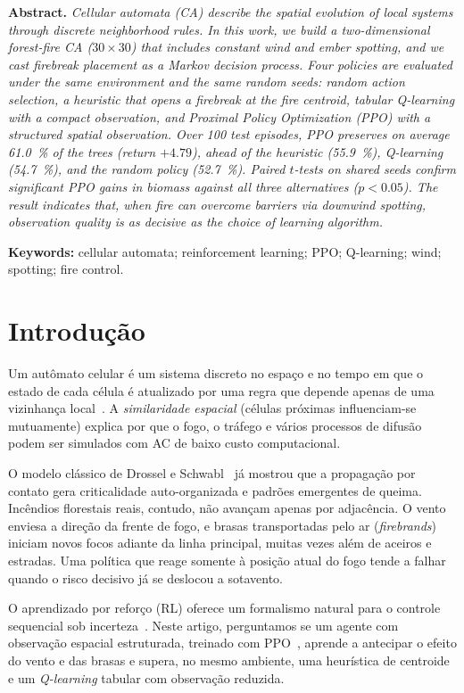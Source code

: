 \documentclass[11pt,a4paper]{article}
\begin{document}
\bigskip
\noindent\textbf{Abstract.}
\textit{Cellular automata (CA) describe the spatial evolution of local systems
through discrete neighborhood rules. In this work, we build a two-dimensional
forest-fire CA ($30\times 30$) that includes constant wind and ember spotting,
and we cast firebreak placement as a Markov decision process. Four policies
are evaluated under the same environment and the same random seeds: random
action selection, a heuristic that opens a firebreak at the fire centroid,
tabular \emph{Q-learning} with a compact observation, and Proximal Policy
Optimization (PPO) with a structured spatial observation. Over 100 test episodes, PPO
preserves on average \SI{61.0}{\percent} of the trees (return $+4.79$), ahead
of the heuristic (\SI{55.9}{\percent}), \emph{Q-learning}
(\SI{54.7}{\percent}), and the random policy (\SI{52.7}{\percent}).
Paired $t$-tests on shared seeds confirm significant PPO gains in biomass
against all three alternatives ($p<0.05$).
The result
indicates that, when fire can overcome barriers via downwind spotting, observation
quality is as decisive as the choice of learning algorithm.}

\medskip
\noindent\textbf{Keywords:}
cellular automata; reinforcement learning; PPO; Q-learning; wind; spotting;
fire control.


\section{Introdução}
\label{sec:intro}

Um autômato celular é um sistema discreto no espaço e no tempo em que o estado
de cada célula é atualizado por uma regra que depende apenas de uma vizinhança
local~\cite{schiff2008}.
A \emph{similaridade espacial} (células próximas influenciam-se mutuamente)
explica por que o fogo, o tráfego e vários processos de difusão podem ser
simulados com AC de baixo custo computacional.

O modelo clássico de Drossel e Schwabl~\cite{drossel1992} já mostrou que a
propagação por contato gera criticalidade auto-organizada e padrões emergentes
de queima.
Incêndios florestais reais, contudo, não avançam apenas por adjacência.
O vento enviesa a direção da frente de fogo, e brasas transportadas pelo ar
(\emph{firebrands}) iniciam novos focos adiante da linha principal, muitas
vezes além de aceiros e estradas.
Uma política que reage somente à posição atual do fogo tende a falhar quando o
risco decisivo já se deslocou a sotavento.

O aprendizado por reforço (RL) oferece um formalismo natural para o controle
sequencial sob incerteza~\cite{sutton2018}.
Neste artigo, perguntamos se um agente com observação espacial estruturada, treinado
com PPO~\cite{schulman2017}, aprende a antecipar o efeito do vento e das brasas
e supera, no mesmo ambiente, uma heurística de centroide e um
\emph{Q-learning} tabular com observação reduzida.
\end{document}
